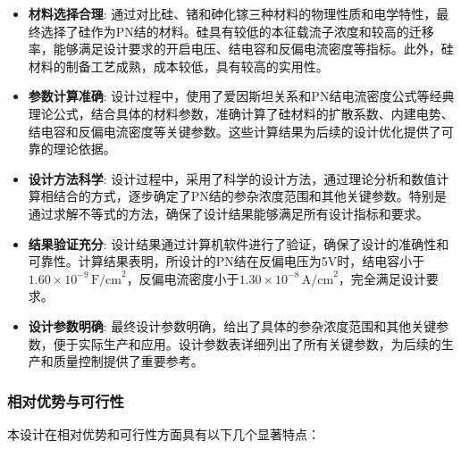 \documentclass[12pt,hyperref,a4paper,UTF8]{ctexart}
\begin{document}
\begin{itemize}
    \item \textbf{材料选择合理}: 通过对比硅、锗和砷化镓三种材料的物理性质和电学特性，最终选择了硅作为PN结的材料。硅具有较低的本征载流子浓度和较高的迁移率，能够满足设计要求的开启电压、结电容和反偏电流密度等指标。此外，硅材料的制备工艺成熟，成本较低，具有较高的实用性。

    \item \textbf{参数计算准确}: 设计过程中，使用了爱因斯坦关系和PN结电流密度公式等经典理论公式，结合具体的材料参数，准确计算了硅材料的扩散系数、内建电势、结电容和反偏电流密度等关键参数。这些计算结果为后续的设计优化提供了可靠的理论依据。

    \item \textbf{设计方法科学}: 设计过程中，采用了科学的设计方法，通过理论分析和数值计算相结合的方式，逐步确定了PN结的参杂浓度范围和其他关键参数。特别是通过求解不等式的方法，确保了设计结果能够满足所有设计指标和要求。

    \item \textbf{结果验证充分}: 设计结果通过计算机软件进行了验证，确保了设计的准确性和可靠性。计算结果表明，所设计的PN结在反偏电压为5V时，结电容小于$1.60 \times 10^{-9}\, \text{F/cm}^2$，反偏电流密度小于$1.30 \times 10^{-8}\, \text{A/cm}^2$，完全满足设计要求。

    \item \textbf{设计参数明确}: 最终设计参数明确，给出了具体的参杂浓度范围和其他关键参数，便于实际生产和应用。设计参数表详细列出了所有关键参数，为后续的生产和质量控制提供了重要参考。

\end{itemize}

\subsubsection*{相对优势与可行性}
本设计在相对优势和可行性方面具有以下几个显著特点：
\end{document}
